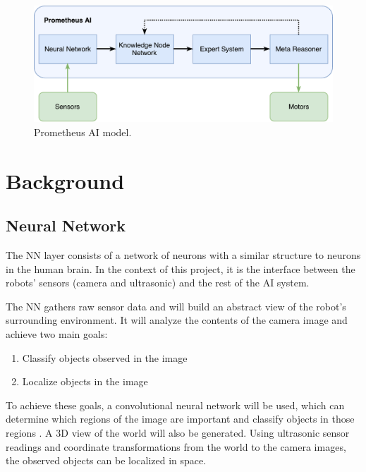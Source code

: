 \documentclass[titlepage,11pt]{article}
\begin{document}
\begin{figure}[!htb]
	\includegraphics[width=\columnwidth]{figures/ai_model.pdf}
	\caption{Prometheus AI model.}
	\label{model}
\end{figure}

\section{Background}
\label{sec:background}

\subsection{Neural Network}

The NN layer consists of a network of neurons with a similar structure to neurons in the human brain. In the context of this project, it is the interface between the robots' sensors (camera and ultrasonic) and the rest of the AI system.

The NN gathers raw sensor data and will build an abstract view of the robot's surrounding environment. It will analyze the contents of the camera image and achieve two main goals:

\begin{enumerate}
	\item Classify objects observed in the image
	\item Localize objects in the image
\end{enumerate}

To achieve these goals, a convolutional neural network will be used, which can determine which regions of the image are important and classify objects in those regions \cite{conv}. A 3D view of the world will also be generated. Using ultrasonic sensor readings and coordinate transformations from the world to the camera images, the observed objects can be localized in space.
\end{document}
